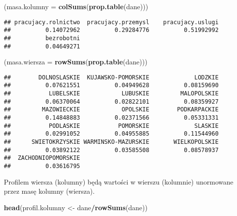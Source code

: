 \documentclass[polish,]{book}
\newenvironment{Shaded}{\begin{snugshade}}{\end{snugshade}}
\newcommand{\DataTypeTok}[1]{\textcolor[rgb]{0.13,0.29,0.53}{#1}}
\newcommand{\KeywordTok}[1]{\textcolor[rgb]{0.13,0.29,0.53}{\textbf{#1}}}
\newcommand{\NormalTok}[1]{#1}
\newcommand{\OperatorTok}[1]{\textcolor[rgb]{0.81,0.36,0.00}{\textbf{#1}}}
\newcommand{\StringTok}[1]{\textcolor[rgb]{0.31,0.60,0.02}{#1}}
\begin{document}
\begin{Shaded}
\begin{Highlighting}[]
\NormalTok{(}\DataTypeTok{masa.kolumny =} \KeywordTok{colSums}\NormalTok{(}\KeywordTok{prop.table}\NormalTok{(dane)))}
\end{Highlighting}
\end{Shaded}

\begin{verbatim}
## pracujacy.rolnictwo  pracujacy.przemysl    pracujacy.uslugi 
##          0.14072962          0.29284776          0.51992992 
##          bezrobotni 
##          0.04649271
\end{verbatim}

\begin{Shaded}
\begin{Highlighting}[]
\NormalTok{(}\DataTypeTok{masa.wiersza =} \KeywordTok{rowSums}\NormalTok{(}\KeywordTok{prop.table}\NormalTok{(dane)))}
\end{Highlighting}
\end{Shaded}

\begin{verbatim}
##        DOLNOSLASKIE  KUJAWSKO-POMORSKIE             LODZKIE 
##          0.07621551          0.04949628          0.08159690 
##           LUBELSKIE            LUBUSKIE         MALOPOLSKIE 
##          0.06370064          0.02822101          0.08359927 
##         MAZOWIECKIE            OPOLSKIE        PODKARPACKIE 
##          0.14848883          0.02371566          0.05331331 
##           PODLASKIE           POMORSKIE             SLASKIE 
##          0.02991052          0.04955885          0.11544960 
##      SWIETOKRZYSKIE WARMINSKO-MAZURSKIE       WIELKOPOLSKIE 
##          0.03892122          0.03585508          0.08578937 
##  ZACHODNIOPOMORSKIE 
##          0.03616795
\end{verbatim}

Profilem wiersza (kolumny) będą wartości w wierszu (kolumnie) unormowane
przez masę kolumny (wiersza).

\begin{Shaded}
\begin{Highlighting}[]
\KeywordTok{head}\NormalTok{(profil.kolumny <-}\StringTok{ }\NormalTok{dane}\OperatorTok{/}\KeywordTok{rowSums}\NormalTok{(dane))}
\end{Highlighting}
\end{Shaded}
\end{document}
